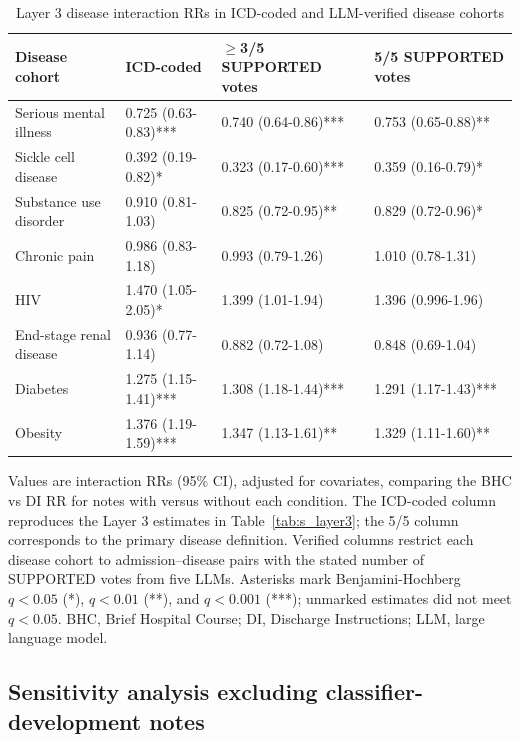 \documentclass[unnumsec,webpdf,contemporary,large]{oup-authoring-template}
\begin{document}
\begin{table}[H]
\caption{Layer 3 disease interaction RRs in ICD-coded and LLM-verified disease cohorts}
\label{tab:s_llm_layer3}
\centering
\small
\begin{tabular}{llll}
\toprule
Disease cohort & ICD-coded & \(\geq\)3/5 SUPPORTED votes & 5/5 SUPPORTED votes \\
\midrule
Serious mental illness & 0.725 (0.63-0.83)*** & 0.740 (0.64-0.86)*** & 0.753 (0.65-0.88)** \\
Sickle cell disease & 0.392 (0.19-0.82)* & 0.323 (0.17-0.60)*** & 0.359 (0.16-0.79)* \\
Substance use disorder & 0.910 (0.81-1.03) & 0.825 (0.72-0.95)** & 0.829 (0.72-0.96)* \\
Chronic pain & 0.986 (0.83-1.18) & 0.993 (0.79-1.26) & 1.010 (0.78-1.31) \\
HIV & 1.470 (1.05-2.05)* & 1.399 (1.01-1.94) & 1.396 (0.996-1.96) \\
End-stage renal disease & 0.936 (0.77-1.14) & 0.882 (0.72-1.08) & 0.848 (0.69-1.04) \\
Diabetes & 1.275 (1.15-1.41)*** & 1.308 (1.18-1.44)*** & 1.291 (1.17-1.43)*** \\
Obesity & 1.376 (1.19-1.59)*** & 1.347 (1.13-1.61)** & 1.329 (1.11-1.60)** \\
\bottomrule
\end{tabular}
\begin{tablenotes}
\item Values are interaction RRs (95\% CI), adjusted for covariates, comparing the BHC vs DI RR for notes with versus without each condition. The ICD-coded column reproduces the Layer 3 estimates in Table~\ref{tab:s_layer3}; the 5/5 column corresponds to the primary disease definition. Verified columns restrict each disease cohort to admission--disease pairs with the stated number of SUPPORTED votes from five LLMs. Asterisks mark Benjamini-Hochberg \(q<0.05\) (*), \(q<0.01\) (**), and \(q<0.001\) (***); unmarked estimates did not meet \(q<0.05\). BHC, Brief Hospital Course; DI, Discharge Instructions; LLM, large language model.
\end{tablenotes}
\end{table}

\subsection{Sensitivity analysis excluding classifier-development notes}
\end{document}
